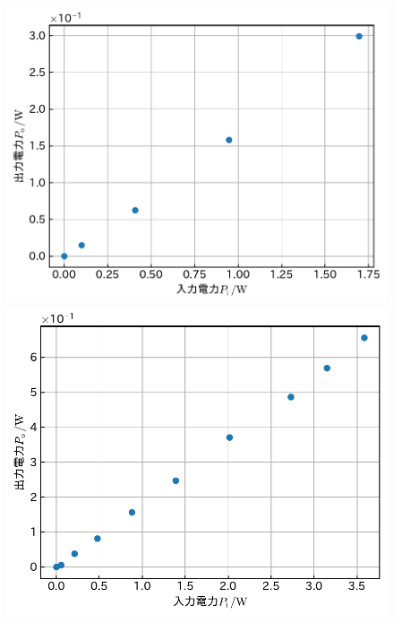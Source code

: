 \documentclass[1_power_supply.tex]{subfiles}
\begin{document}
\begin{figure}[htbp]
	\vspace{1mm}
	\begin{minipage}{0.45\columnwidth}
		\centering
		\includegraphics[width=0.8\columnwidth]{2_40p.pdf}
		\caption{}\label{fig:2_40p}
	\end{minipage}
	\begin{minipage}{0.45\columnwidth}
		\centering
		\includegraphics[width=0.8\columnwidth]{2_50p.pdf}
		\caption{}\label{fig:2_50p}
	\end{minipage}


\end{figure}
\end{document}
